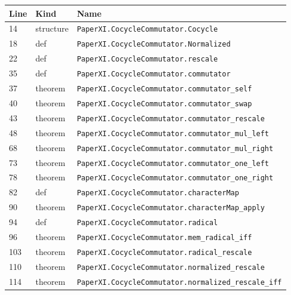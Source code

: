 \documentclass[10pt,oneside]{book}
\begin{document}
\begin{longtable}{@{}p{}p{}p{}@{}}\toprule Line&Kind&Name\\\midrule\endhead

14&structure&\nolinkurl{PaperXI.CocycleCommutator.Cocycle}\\

18&def&\nolinkurl{PaperXI.CocycleCommutator.Normalized}\\

22&def&\nolinkurl{PaperXI.CocycleCommutator.rescale}\\

35&def&\nolinkurl{PaperXI.CocycleCommutator.commutator}\\

37&theorem&\nolinkurl{PaperXI.CocycleCommutator.commutator_self}\\

40&theorem&\nolinkurl{PaperXI.CocycleCommutator.commutator_swap}\\

43&theorem&\nolinkurl{PaperXI.CocycleCommutator.commutator_rescale}\\

48&theorem&\nolinkurl{PaperXI.CocycleCommutator.commutator_mul_left}\\

68&theorem&\nolinkurl{PaperXI.CocycleCommutator.commutator_mul_right}\\

73&theorem&\nolinkurl{PaperXI.CocycleCommutator.commutator_one_left}\\

78&theorem&\nolinkurl{PaperXI.CocycleCommutator.commutator_one_right}\\

82&def&\nolinkurl{PaperXI.CocycleCommutator.characterMap}\\

90&theorem&\nolinkurl{PaperXI.CocycleCommutator.characterMap_apply}\\

94&def&\nolinkurl{PaperXI.CocycleCommutator.radical}\\

96&theorem&\nolinkurl{PaperXI.CocycleCommutator.mem_radical_iff}\\

103&theorem&\nolinkurl{PaperXI.CocycleCommutator.radical_rescale}\\

110&theorem&\nolinkurl{PaperXI.CocycleCommutator.normalized_rescale}\\

114&theorem&\nolinkurl{PaperXI.CocycleCommutator.normalized_rescale_iff}\\

\bottomrule\end{longtable}
\end{document}
